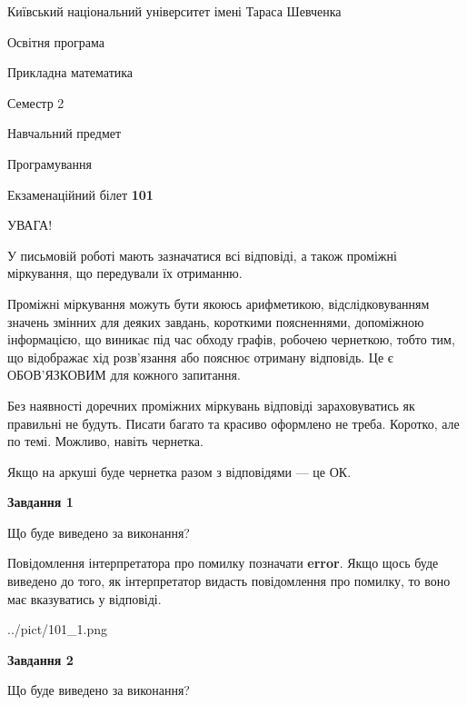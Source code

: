 \documentclass[12pt, ukrainian]{article}
\begin{document}
{{\begin {small}\par
{ \center  Київський національний університет імені Тараса Шевченка \par}
{\parbox {5 cm}{Освітня програма \hfill}{\parbox {7 cm}{Прикладна математика \hfill}}\parbox {6 cm}{\hfill Семестр 2}}\par
{\parbox {5 cm} {Навчальний предмет \hfill}\parbox {7 cm}{Програмування \hfill}\parbox {6cm}{\hfill}\par}\vspace{-7pt} \end{small}}{\center Екзаменаційний білет \No \textbf
{ 101 }\par}}
{
\begin {large}
УВАГА!

У письмовій роботі мають зазначатися всі відповіді, а також проміжні міркування, що передували їх отриманню.

Проміжні міркування можуть бути якоюсь арифметикою, відслідковуванням зна\-чень змінних для деяких завдань,
короткими поясненнями, допоміжною інформацією, що виникає під час обходу графів, робочею чернеткою,
тобто тим, що відображає хід розв’язання або пояснює отриману відповідь.
Це є ОБОВ’ЯЗКОВИМ для кожного запитання.

Без наявності доречних проміжних міркувань відповіді зараховуватись як правиль\-ні не будуть.
Писати багато та красиво оформлено не треба. Коротко, але по темі. Можли\-во, навіть чернетка.

Якщо на аркуші буде чернетка разом з відповідями --- це ОК.

\newpage

{\begin {center}\textbf{Завдання 1}\end {center}}\par
Що буде виведено за виконання?

Повідомлення інтерпретатора про помилку позначати \textbf{error}.
Якщо щось буде виведено до того, як інтерпретатор видасть повідомлення про помилку, 
то воно має вказуватись у відповіді. \par


\begin{center}
	{../pict/101_1.png}
\end{center}
\newpage

{\begin {center}\textbf{Завдання 2}\end {center}}\par
Що буде виведено за виконання?


\end{large}}
\end{document}
